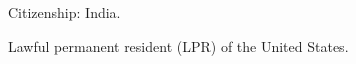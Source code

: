 \documentclass{article}
\begin{document}

\vspace{1em}

Citizenship: India.

Lawful permanent resident (LPR) of the United States.
\end{document}
